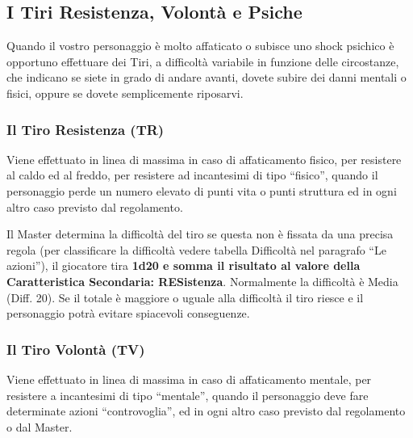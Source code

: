 \fi

{\raggedright \subsection{I Tiri Resistenza, Volont\`a e Psiche}}

Quando il vostro personaggio \`e molto affaticato o subisce uno shock
psichico \`e opportuno effettuare dei Tiri, a difficolt\`a variabile in
funzione delle circostanze, che indicano se siete in grado di andare
avanti, dovete subire dei danni mentali o fisici, oppure se dovete
semplicemente riposarvi.

\subsubsection{Il Tiro Resistenza (TR)}

Viene effettuato in linea di massima in caso di affaticamento fisico,
per resistere al caldo ed al freddo, per resistere ad incantesimi di
tipo ``fisico'', quando il personaggio perde un numero elevato di
punti vita o punti struttura ed in ogni altro caso previsto dal
regolamento. 

Il Master determina la difficolt\`a del tiro se questa
non \`e fissata da una precisa regola (per classificare la
difficolt\`a vedere tabella Difficolt\`a nel paragrafo ``Le
azioni''), il giocatore tira \textbf{1d20 e somma il risultato al valore della
Caratteristica Secondaria: RESistenza}.  Normalmente la difficolt\`a
\`e Media (Diff. 20). Se il totale \`e maggiore o uguale alla
difficolt\`a il tiro riesce e il personaggio potr\`a evitare
spiacevoli conseguenze.

\subsubsection{Il Tiro Volont\`a (TV)}

Viene effettuato in linea di massima in caso di affaticamento mentale,
per resistere a incantesimi di tipo ``mentale'', quando il personaggio
deve fare determinate azioni ``controvoglia'', ed in ogni altro caso
previsto dal regolamento o dal Master.

